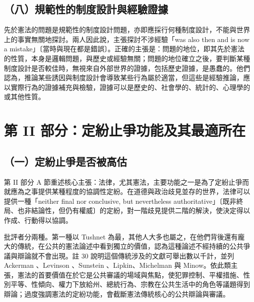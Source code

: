 \subsection{（八）規範性的制度設計與經驗證據}

先於憲法的問題是規範性的制度設計問題，亦即應採行何種制度設計，不能與世界上的事實無關地探討。兩人因此說，主張探討不涉經驗「was also then and is now a mistake」〔當時與現在都是錯誤〕。正確的主張是：問題的地位，即其先於憲法的性質，本身是邏輯問題，與歷史或經驗無關；問題的地位確立之後，要判斷某種制度設計是否較佳時，無視來自外部世界的證據，包括歷史證據，是愚蠢的。他們認為，推論某些誘因與制度設計會導致某些行為屬於適當，但這些是經驗推論，應以實際行為的證據補充與檢驗，證據可以是歷史的、社會學的、統計的、心理學的或其他性質。

\section{第 II 部分：定紛止爭功能及其最適所在}
\label{sec:AS-3}

\subsection{（一）定紛止爭是否被高估}

第 II 部分 A 節重述核心主張：法律，尤其憲法，主要功能之一是為了定紛止爭而就應為之事提供某種程度的協調性定紛。在道德與政治歧見並存的世界，法律可以提供一種「neither final nor conclusive, but nevertheless authoritative」〔既非終局、也非結論性，但仍有權威〕的定紛，對一階歧見提供二階的解決，使決定得以作成、行動得以協調。

批評者分兩種。第一種以 Tushnet 為最，其他人大多也屬之，在他們背後還有龐大的傳統，在公共的憲法論述中看到獨立的價值，認為這種論述不經持續的公共爭議與辯論就不會出現。註 30 說明這個傳統涉及的文獻可舉出數以千計，並列 Ackerman 、Levinson 、Sunstein 、Lipkin、Michelman 與 Minow。依此類主張，憲法的首要價值在於它是公共審議的場域與焦點，使犯罪控制、平權措施、性別平等、性傾向、權力下放給州、總統行為、宗教在公共生活中的角色等議題得到辯論；過度強調憲法的定紛功能，會截斷憲法傳統核心的公共辯論與審議。

